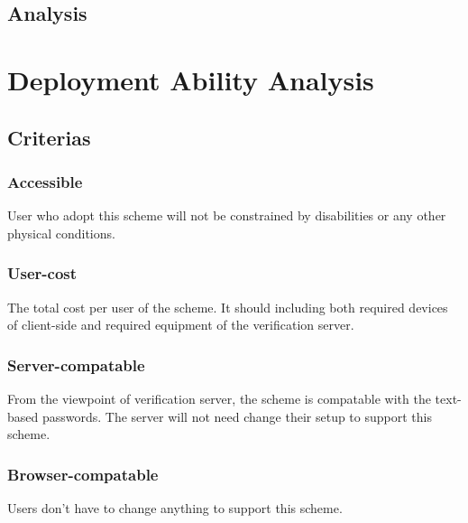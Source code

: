 \begin{CJK}{Bg5}{bsmi}
\subsection{Analysis}

\section{Deployment Ability Analysis}

\subsection{Criterias}

\subsubsection{Accessible}

User who adopt this scheme will not be constrained by disabilities or any other physical conditions.

\subsubsection{User-cost}

The total cost per user of the scheme. It should including both required devices of client-side and required equipment of the verification server.

\subsubsection{Server-compatable}

From the viewpoint of verification server, the scheme is compatable with the text-based passwords. The server will not need change their setup to support this scheme. 

\subsubsection{Browser-compatable}

Users don't have to change anything to support this scheme. 


\end{CJK}
